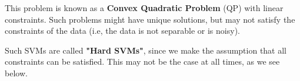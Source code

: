 \documentclass[11pt]{article}
\begin{document}
This problem is known as a \textbf{Convex Quadratic Problem} (QP) with linear constraints. Such problems might have unique solutions, but may not satisfy the constraints of the data (i.e, the data is not separable or is noisy).

Such SVMs are called \textbf{"Hard SVMs"}, since we make the assumption that all constraints can be satisfied. This may not be the case at all times, as we see below.








\end{document}
